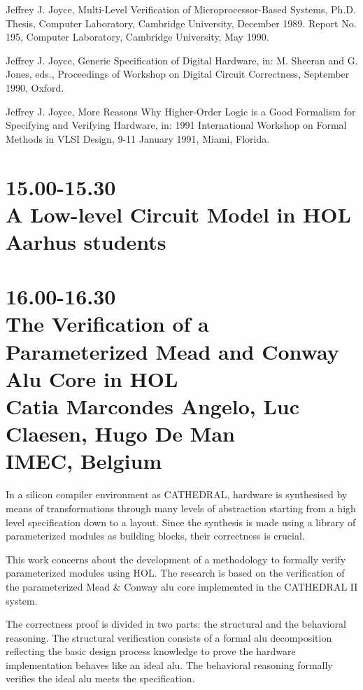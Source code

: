 \begin{thebibliography}{99}

Jeffrey J. Joyce,
Multi-Level Verification of Microprocessor-Based Systems,
Ph.D. Thesis,
Computer Laboratory, Cambridge University,
December 1989.
Report No. 195, Computer Laboratory, Cambridge University,
May 1990.

Jeffrey J. Joyce,
Generic Specification of Digital Hardware,
in: M. Sheeran and G. Jones, eds.,
Proceedings of Workshop on Digital Circuit Correctness,
September 1990, Oxford.

Jeffrey J. Joyce,
More Reasons
Why Higher-Order Logic is a Good Formalism
for Specifying and Verifying Hardware,
in: 1991 International Workshop on Formal Methods in VLSI Design,
9-11 January 1991, Miami, Florida.

\end{thebibliography}

\vspace{2in}
\section*{15.00-15.30\\
A Low-level Circuit Model in HOL\\
Aarhus students}

\newpage
\section*{16.00-16.30\\
The Verification of a Parameterized Mead and Conway Alu Core in HOL\\
Catia Marcondes Angelo, Luc Claesen, Hugo De Man\\
\large\bf IMEC, Belgium}

        In a silicon compiler environment as CATHEDRAL, hardware is
synthesised by means of transformations through many levels of abstraction
starting from a high level specification down to a layout. Since the
synthesis is made using a library of parameterized modules as building
blocks, their correctness is crucial.

        This work concerns about the development of a methodology to
formally verify parameterized modules using HOL. The research is based
on the verification of the parameterized Mead \& Conway alu core implemented
in the CATHEDRAL II system.

        The correctness proof is divided in two parts: the structural
and the behavioral reasoning. The structural verification consists of a
formal alu decomposition reflecting the basic design process knowledge
to prove the hardware implementation behaves like an ideal alu. The
behavioral reasoning formally verifies the ideal alu meets the
specification.

